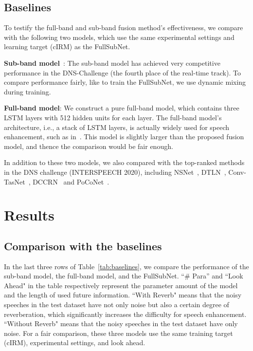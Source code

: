 \documentclass{article}
\begin{document}
\begin{table*}[!t]
\end{table*}

\subsection{Baselines}
To testify the full-band and sub-band fusion method's effectiveness, we compare with the following two models, which use the same experimental settings and learning target (cIRM) as the FullSubNet.

\noindent \textbf{ Sub-band model}~\cite{sub_dns_xiaofeili}: The sub-band model has achieved very competitive performance in the DNS-Challenge (the fourth place of the real-time track). To compare performance fairly, like to train the FullSubNet, we use dynamic mixing during training.

\noindent \textbf{ Full-band model}: We construct a pure full-band model, which contains three LSTM layers with 512 hidden units for each layer.  The full-band model's architecture, i.e., a stack of LSTM layers, is actually widely used for speech enhancement, such as in~\cite{se_lstm_noise_asr,lstm_ss}. This model is slightly larger than the proposed fusion model, and thence the comparison would be fair enough.

In addition to these two models, we also compared with the top-ranked methods in the DNS challenge (INTERSPEECH 2020), including NSNet~\cite{dns_1_nsnet}, DTLN~\cite{DTLN}, Conv-TasNet~\cite{dns_conv_tasnet}, DCCRN~\cite{DCCRN} and PoCoNet~\cite{PoCoNet}.

\section{Results}
\subsection{Comparison with the baselines}
In the last three rows of Table~\ref{tab:baselines}, we compare the performance of the sub-band model, the full-band model, and the FullSubNet. ``\# Para'' and ``Look Ahead" in the table respectively represent the parameter amount of the model and the length of used future information. ``With Reverb" means that the noisy speeches in the test dataset have not only noise but also a certain degree of reverberation, which significantly increases the difficulty for speech enhancement. ``Without Reverb" means that the noisy speeches in the test dataset have only noise. For a fair comparison, these three models use the same training target (cIRM), experimental settings, and look ahead.
\end{document}
